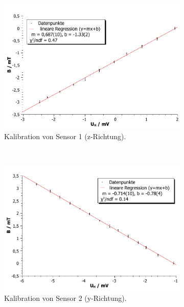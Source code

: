 \documentclass[12pt,a4paper]{article}
\begin{document}
\begin{figure}
	\centering
	\begin{subfigure}[c]{0.7\textwidth}
		\centering
		\includegraphics[scale=0.7]{sensor1.pdf}
		\caption{Kalibration von Sensor 1 (z-Richtung).}
		\label{kalib_plot_a}
	\end{subfigure}\\
	\begin{subfigure}[c]{0.7\textwidth}
		\centering
		\includegraphics[scale=0.7]{sensor2.pdf}
		\caption{Kalibration von Sensor 2 (y-Richtung).}
		\label{kalib_plot_b}
	\end{subfigure}\\
	\begin{subfigure}[c]{0.7\textwidth}
		\centering

\end{subfigure}
\end{figure}
\end{document}
